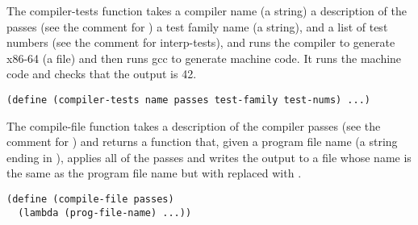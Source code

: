 \documentclass[11pt]{book}
\begin{document}
The compiler-tests function takes a compiler name (a string) a
description of the passes (see the comment for ) a
test family name (a string), and a list of test numbers (see the
comment for interp-tests), and runs the compiler to generate x86-64 (a
 file) and then runs gcc to generate machine code.  It runs
the machine code and checks that the output is 42.
\begin{lstlisting}
(define (compiler-tests name passes test-family test-nums) ...)
\end{lstlisting}

The compile-file function takes a description of the compiler passes
(see the comment for ) and returns a function that,
given a program file name (a string ending in ), applies all
of the passes and writes the output to a file whose name is the same
as the program file name but with  replaced with .
\begin{lstlisting}
(define (compile-file passes)
  (lambda (prog-file-name) ...))
\end{lstlisting}



\end{document}
